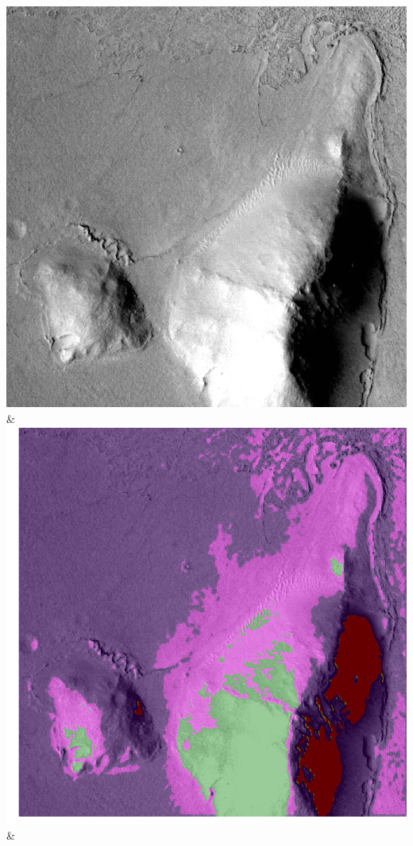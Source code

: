 \begin{table}[h!]
\begin{tabularx}{\textwidth}
		\includegraphics[width=0.9\linewidth]{images/p03/p03_04.png} &
		\includegraphics[width=0.9\linewidth]{images/gen/convolution_number/p03_04.png_2.png} &

\end{tabularx}
\end{table}
